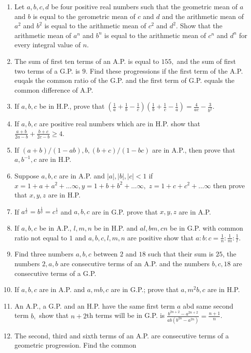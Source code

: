 \begin{enumerate}
\item Let $a, b, c, d$ be four positive real numbers such that the geometric mean of $a$ and $b$ is equal to the
  gerometric mean of $c$ and $d$ and the arithmetic mean of $a^2$ and $b^2$ is equal to the arithmetic mean of $c^2$ and $d^2.$
  Show that the arithmetic mean of $a^n$ and $b^n$ is equal to the arithmetic mean of $c^n$ and $d^n$ for every integral value of
  $n$.
\item The sum of first ten terms of an A.P. is equal to $155,$ and the sum of first two terms of a G.P. is $9.$ Find
  these progressions if the first term of the A.P. euqals the common ratio of the G.P. and the first term of G.P. equals the common
  difference of A.P.
\item If $a, b, c$ be in H.P., prove that $\left(\frac{1}{a} + \frac{1}{b} - \frac{1}{c}\right)\left(\frac{1}{b} +
  \frac{1}{c} - \frac{1}{a}\right) = \frac{4}{ac} - \frac{3}{b^2}$.
\item If $a, b, c$ are positive real numbers which are in H.P. show that $\frac{a + b}{2a - b} + \frac{b + c}{2c - b}\geq
  4$.
\item If $(a + b)/(1 - ab), b, (b + c)/(1 - bc)$ are in A.P., then prove that $a, b^{-1}, c$ are in H.P.
\item Suppose $a, b, c$ are in A.P. and $|a|, |b|, |c| < 1$ if $x = 1 + a + a^2 + \ldots \infty, y = 1 + b + b^2 + \ldots
  \infty,$ $z = 1 + c + c^2 + \ldots \infty$ then prove that $x, y, z$ are in H.P.
\item If $a^{\frac{1}{x}} = b^{\frac{1}{y}} = c^{\frac{1}{z}}$ and $a, b, c$ are in G.P. prove that $x, y, z$ are in A.P.
\item If $a, b, c$ be in A.P., $l, m, n$ be in H.P. and $al, bm, cn$ be in G.P. with common ratio not equal to $1$ and
  $a, b, c, l, m, n$ are positive show that $a:b:c = \frac{1}{n}:\frac{1}{m}:\frac{1}{l}$.
\item Find three numbers $a, b, c$ between $2$ and $18$ such that their sum is $25$, the numbers $2, a, b$ are
  consecutive terms of an A.P. and the numbers $b, c, 18$ are consecutive terms of a G.P.
\item If $a, b, c$ are in A.P. and $a, mb, c$ are in G.P.; prove that $a, m^2b, c$ are in H.P.
\item An A.P., a G.P. and an H.P. have the same first term $a$ abd same second term $b,$ show that $n + 2$th terms will
  be in G.P. is $\frac{b^{2n + 2} - a^{2n + 2}}{ab(b^{2n} - a^{2n})} = \frac{n + 1}{n}$.
\item The second, third and sixth terms of an A.P. are consecutive terms of a geometric progression. Find the common

\end{enumerate}
